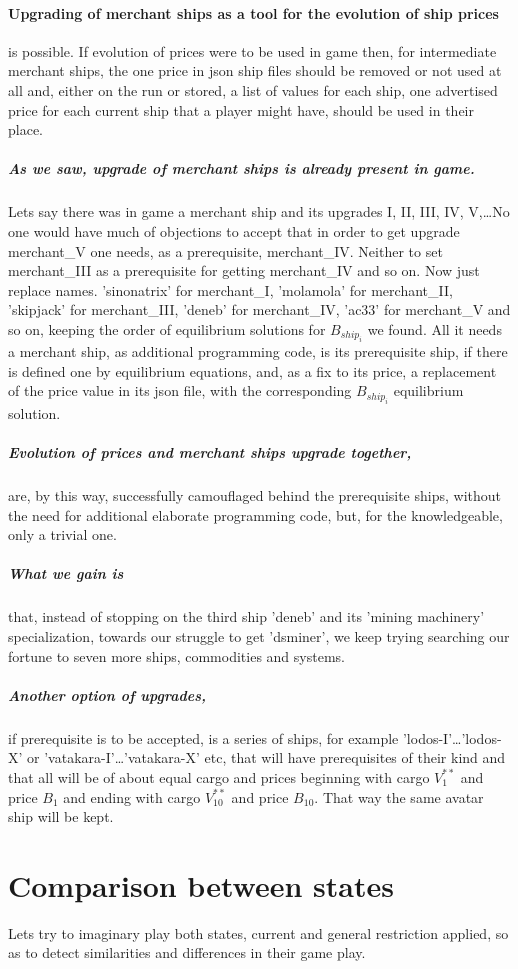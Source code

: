 \documentclass[]{article}
\begin{document}
\paragraph{Upgrading of merchant ships as a tool for the evolution of ship prices} is possible. If evolution of prices were to be used in game then,  for intermediate merchant ships, the one price in json ship files should be removed or not used at all and, either on the run or stored, a list of values for each ship,  one advertised price for each current ship that a player might have, should be used in their place. 
\subparagraph*{As we saw, upgrade of merchant ships is already present in game.} Lets say there was in game a merchant ship and its upgrades I, II, III, IV, V,\ldots No one would have much of objections to accept that in order to get upgrade merchant\_V one needs, as a prerequisite, merchant\_IV. Neither to set merchant\_III as a prerequisite for getting merchant\_IV and so on. Now just replace names. 'sinonatrix' for merchant\_I, 
 'molamola' for merchant\_II, 'skipjack' for merchant\_III, 'deneb' for  merchant\_IV, 
'ac33' for merchant\_V and so on, keeping the order of equilibrium solutions for $B_{ship_{i}}$ we found. All it needs a merchant ship, as additional programming code, is its prerequisite ship, if there is defined one by equilibrium equations, and, as a fix to its price, a replacement of the price value in its json file, with the corresponding $B_{ship_{i}}$ equilibrium solution.\label{prerequisiteShips}
\subparagraph{Evolution of prices and merchant ships upgrade together,} are, by this way, successfully camouflaged behind the prerequisite ships, without the need for additional elaborate programming code, but, for the knowledgeable, only a trivial one.
\subparagraph*{What we gain is} that, instead of stopping on the third ship 'deneb' and its 'mining machinery' specialization, towards our struggle to get 'dsminer', we keep trying searching our fortune to seven more ships, commodities and systems.
\subparagraph{Another option of upgrades,} if prerequisite is to be accepted, is a series of ships, for example 'lodos-I'\ldots'lodos-X' or 'vatakara-I'\ldots'vatakara-X' etc, that will have prerequisites of their kind and that all will be of about equal cargo and prices beginning with cargo $V^{**}_{1}$ and price $B_{1}$ and ending with cargo $V^{**}_{10}$ and price $B_{10}$. That way the same avatar ship will be kept.

\section{Comparison between states}
Lets try to imaginary play both states, current and general restriction applied, so as to detect similarities and differences in their game play.
\end{document}
